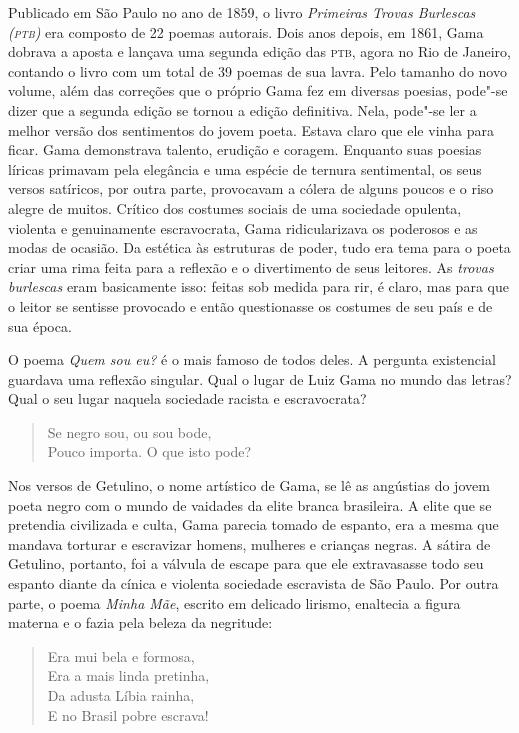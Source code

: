 Publicado em São Paulo no ano de 1859, o livro \emph{Primeiras Trovas
Burlescas (\textsc{ptb})} era composto de 22 poemas autorais. Dois anos depois,
em 1861, Gama dobrava a aposta e lançava uma segunda edição das
\textsc{ptb}, agora no Rio de Janeiro, contando o livro com um total de 39
poemas de sua lavra. Pelo tamanho do novo volume, além das correções que
o próprio Gama fez em diversas poesias, pode"-se dizer que a segunda
edição se tornou a edição definitiva. Nela, pode"-se ler a melhor versão
dos sentimentos do jovem poeta. Estava claro que ele vinha para ficar.
Gama demonstrava talento, erudição e coragem. Enquanto suas poesias
líricas primavam pela elegância e uma espécie de ternura sentimental, os
seus versos satíricos, por outra parte, provocavam a cólera de alguns
poucos e o riso alegre de muitos. Crítico dos costumes sociais de uma
sociedade opulenta, violenta e genuinamente escravocrata, Gama
ridicularizava os poderosos e as modas de ocasião. Da estética às
estruturas de poder, tudo era tema para o poeta criar uma rima feita
para a reflexão e o divertimento de seus leitores. As \emph{trovas
burlescas} eram basicamente isso: feitas sob medida para rir, é claro,
mas para que o leitor se sentisse provocado e então questionasse os
costumes de seu país e de sua época.

O poema \emph{Quem sou eu?} é o mais famoso de todos deles. A pergunta
existencial guardava uma reflexão singular. Qual o lugar de Luiz Gama no
mundo das letras? Qual o seu lugar naquela sociedade racista e
escravocrata?

\begin{verse}
Se negro sou, ou sou bode,\\
Pouco importa. O que isto pode?
\end{verse}

Nos versos de Getulino, o nome artístico de Gama, se lê as angústias do
jovem poeta negro com o mundo de vaidades da elite branca brasileira. A
elite que se pretendia civilizada e culta, Gama parecia tomado de
espanto, era a mesma que mandava torturar e escravizar homens, mulheres
e crianças negras. A sátira de Getulino, portanto, foi a válvula de
escape para que ele extravasasse todo seu espanto diante da cínica e
violenta sociedade escravista de São Paulo. Por outra parte, o poema
\emph{Minha Mãe}, escrito em delicado lirismo, enaltecia a figura
materna e o fazia pela beleza da negritude:

\begin{verse}
Era mui bela e formosa,\\
Era a mais linda pretinha,\\
Da adusta Líbia rainha,\\
E no Brasil pobre escrava!
\end{verse}

